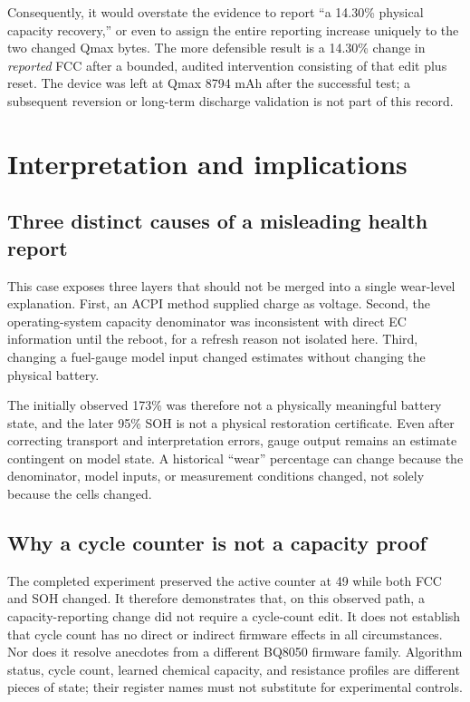 \documentclass[11pt,a4paper]{article}
\begin{document}
Consequently, it would overstate the evidence to report ``a 14.30\% physical capacity recovery,'' or even to assign the entire reporting increase uniquely to the two changed Qmax bytes. The more defensible result is a 14.30\% change in \emph{reported} FCC after a bounded, audited intervention consisting of that edit plus reset. The device was left at Qmax 8794 mAh after the successful test; a subsequent reversion or long-term discharge validation is not part of this record.

\section{Interpretation and implications}
\subsection{Three distinct causes of a misleading health report}
This case exposes three layers that should not be merged into a single wear-level explanation. First, an ACPI method supplied charge as voltage. Second, the operating-system capacity denominator was inconsistent with direct EC information until the reboot, for a refresh reason not isolated here. Third, changing a fuel-gauge model input changed estimates without changing the physical battery.

The initially observed 173\% was therefore not a physically meaningful battery state, and the later 95\% SOH is not a physical restoration certificate. Even after correcting transport and interpretation errors, gauge output remains an estimate contingent on model state. A historical ``wear'' percentage can change because the denominator, model inputs, or measurement conditions changed, not solely because the cells changed.

\subsection{Why a cycle counter is not a capacity proof}
The completed experiment preserved the active counter at 49 while both FCC and SOH changed. It therefore demonstrates that, on this observed path, a capacity-reporting change did not require a cycle-count edit. It does not establish that cycle count has no direct or indirect firmware effects in all circumstances. Nor does it resolve anecdotes from a different BQ8050 firmware family. Algorithm status, cycle count, learned chemical capacity, and resistance profiles are different pieces of state; their register names must not substitute for experimental controls.
\end{document}
